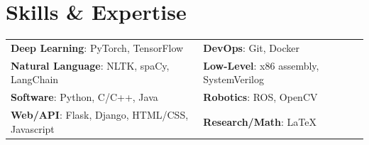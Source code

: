 \documentclass[letterpaper,10pt]{article}
\begin{document}
    \section{Skills \& Expertise}

    \noindent
    \begin{tabular}{p{} p{}}
        \textbf{Deep Learning}: PyTorch, TensorFlow & \textbf{DevOps}: Git, Docker \\
        \textbf{Natural Language}: NLTK, spaCy, LangChain & \textbf{Low-Level}: x86 assembly, SystemVerilog \\
        \textbf{Software}: Python, C/C++, Java & \textbf{Robotics}: ROS, OpenCV \\
        \textbf{Web/API}: Flask, Django, HTML/CSS, Javascript & \textbf{Research/Math}: \LaTeX \\
    \end{tabular}
    
    
\end{document}
